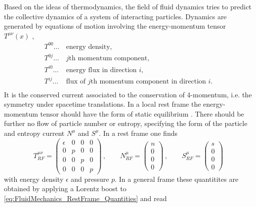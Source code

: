 Based on the ideas of thermodynamics, the field of fluid dynamics tries to predict the collective dynamics of a system of interacting particles.
Dynamics are generated by equations of motion involving the energy-momentum tensor $T^{\mu\nu}(x)$ \cite{Ollitrault_2008},
\begin{equation}
    \begin{split}
        T^{00}\dots\,&\text{energy density,}\\
        T^{0j}\dots\,&\text{$j$th momentum component,}\\
        T^{i0}\dots\,&\text{energy flux in direction $i$,}\\
        T^{ij}\dots\,&\text{flux of $j$th momentum component in direction $i$.}\\
    \end{split}
\end{equation}
It is the conserved current associated to the conservation of 4-momentum, i.e. the symmetry under spacetime translations.  In a local rest frame the energy-momentum tensor should have the form of static equilibrium . There should be further no flow of particle number or entropy, specifying the form of the particle and entropy current $N^\mu$ and $S^\mu$. In a rest frame one finds
\begin{equation}
    T^{\mu\nu}_{RF}  =
        \begin{pmatrix}
            \epsilon & 0 & 0 & 0 \\
            0        & p & 0 & 0 \\
            0        & 0 & p & 0 \\
            0        & 0 & 0 & p
        \end{pmatrix}\,,\qquad
        N^\mu_{RF}       =
        \begin{pmatrix}
            n\\0\\0\\0
        \end{pmatrix}\,,\qquad
        S^\mu_{RF}       =
        \begin{pmatrix}
            s\\0\\0\\0
        \end{pmatrix}
        \label{eq:FluidMechanics_RestFrame_Quantities}
\end{equation}
with energy density $\epsilon$ and pressure $p$.  In a general frame these quantitites are obtained by applying a Lorentz boost to \eqref{eq:FluidMechanics_RestFrame_Quantities} and read \cite{Rischke_2022,Weinberg_2008}
